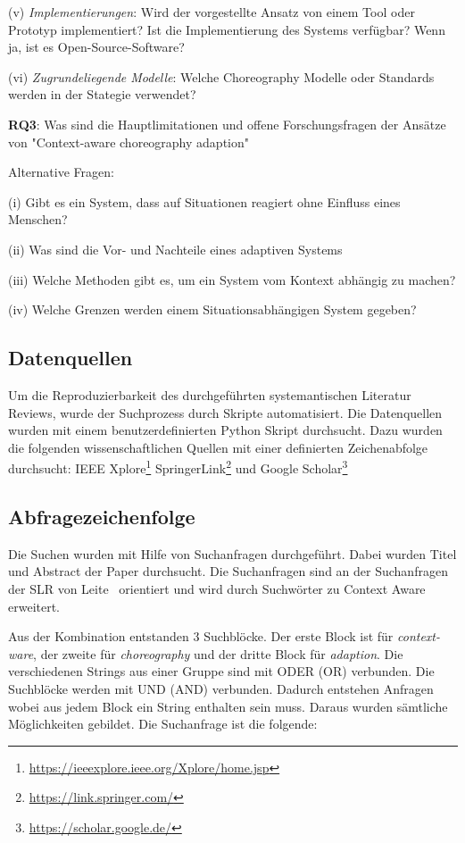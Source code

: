 \documentclass[conference,compsoc]{IEEEtran}
\begin{document}
(v) \textit{Implementierungen}: Wird der vorgestellte Ansatz von einem Tool oder Prototyp implementiert? Ist die Implementierung des Systems verfügbar? Wenn ja, ist es Open-Source-Software?

(vi) \textit{Zugrundeliegende Modelle}: Welche Choreography Modelle oder Standards werden in der Stategie verwendet?

\textbf{RQ3}: Was sind die Hauptlimitationen und offene Forschungsfragen der Ansätze von "Context-aware choreography adaption"
\newpage

Alternative Fragen:

(i) Gibt es ein System, dass auf Situationen reagiert ohne Einfluss eines Menschen?

(ii) Was sind die Vor- und Nachteile eines adaptiven Systems

(iii) Welche Methoden gibt es, um ein System vom Kontext abhängig zu machen?

(iv) Welche Grenzen werden einem Situationsabhängigen System gegeben?


\subsection{Datenquellen}
Um die Reproduzierbarkeit des durchgeführten systemantischen Literatur Reviews, wurde der Suchprozess durch Skripte automatisiert. Die Datenquellen wurden mit einem benutzerdefinierten Python Skript durchsucht. Dazu wurden die folgenden wissenschaftlichen Quellen mit einer definierten Zeichenabfolge durchsucht: IEEE Xplore\footnote{\url{https://ieeexplore.ieee.org/Xplore/home.jsp}} SpringerLink\footnote{\url{https://link.springer.com/}} und Google Scholar\footnote{\url{https://scholar.google.de/}}


\subsection{Abfragezeichenfolge}
Die Suchen wurden mit Hilfe von Suchanfragen durchgeführt. Dabei wurden Titel und Abstract der Paper durchsucht.
Die Suchanfragen sind an der Suchanfragen der SLR von Leite~\cite{leite2013systematic} orientiert und wird durch Suchwörter zu Context Aware erweitert.

Aus der Kombination entstanden 3 Suchblöcke. Der erste Block ist für \textit{context-ware}, der zweite für \textit{choreography} und der dritte Block für \textit{adaption}. Die verschiedenen Strings aus einer Gruppe sind mit ODER (OR) verbunden. Die Suchblöcke werden mit UND (AND) verbunden. Dadurch entstehen Anfragen wobei aus jedem Block ein String enthalten sein muss. Daraus wurden sämtliche Möglichkeiten gebildet. 
Die Suchanfrage ist die folgende: \\
\end{document}
